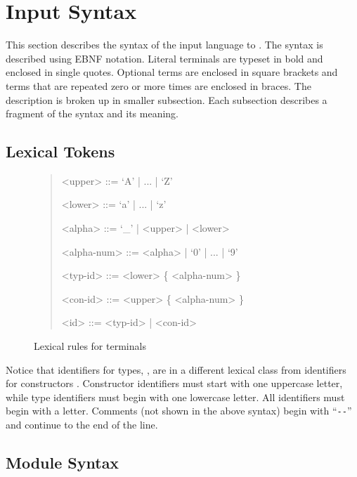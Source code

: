 %
\chapter{Input Syntax}
\label{chap:syntax}

This section describes the syntax of the input language to \asdlgen{}.
The syntax is described using EBNF notation.
Literal terminals are typeset in bold and enclosed in single quotes.
Optional terms are enclosed in square brackets and terms that are
repeated zero or more times are enclosed in braces.
The description is broken up in smaller subsection.
Each subsection describes a fragment of
the syntax and its meaning.

\section{Lexical Tokens}

\begin{figure}[t]
  \begin{quote}
    \begin{grammar}
      <upper>     ::= `A' | ... | `Z'

      <lower>     ::= `a' | ... | `z'

      <alpha>     ::= `_' | <upper> | <lower>

      <alpha-num> ::= <alpha> | `0' | ... | `9'

      <typ-id>    ::= <lower> \{ <alpha-num> \}

      <con-id>    ::= <upper> \{ <alpha-num> \}

      <id>        ::= <typ-id> | <con-id>
    \end{grammar}
  \end{quote}
  \caption{Lexical rules for \asdl{} terminals}
  \label{fig:lexical-syntax}
\end{figure}%

Notice that identifiers for types, , are in a different
lexical class from identifiers for constructors
. Constructor identifiers must start with one uppercase
letter, while type identifiers must begin with one lowercase
letter. All identifiers must begin with a letter.  Comments (not shown
in the above syntax) begin with ``\lstinline[language=ASDL]!--!''
and continue to the end of the line.

\section{Module Syntax}

